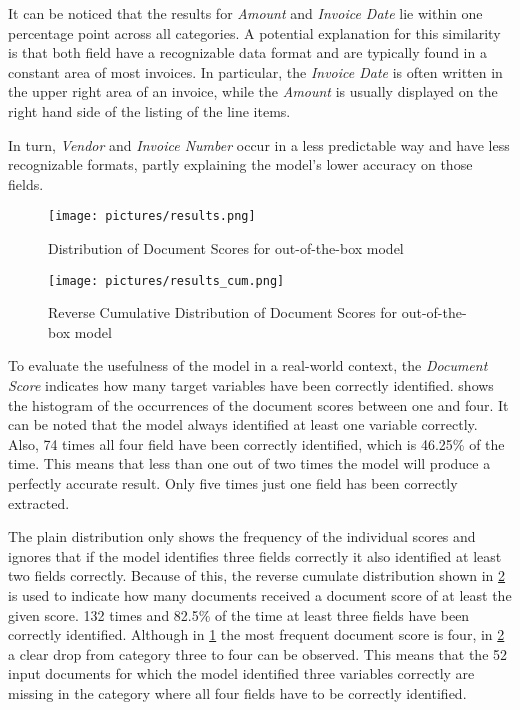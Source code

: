 It can be noticed that the results for \textit{Amount} and \textit{Invoice Date} lie within one percentage point across all categories. A potential explanation for this similarity is that both field have a recognizable data format and are typically found in a constant area of most invoices. In particular, the \textit{Invoice Date} is often written in the upper right area of an invoice, while the \textit{Amount} is usually displayed on the right hand side of the listing of the line items.

In turn, \textit{Vendor} and \textit{Invoice Number} occur in a less predictable way and have less recognizable formats, partly explaining the model's lower accuracy on those fields. 

\begin{figure}[!ht]
    \centering 
    \texttt{[image: pictures/results.png]}
    \caption{Distribution of Document Scores for out-of-the-box model}
    \label{pic:results_1}    %
\end{figure}
\begin{figure}[!ht]
    \centering 
    \texttt{[image: pictures/results\_cum.png]}
    \caption{Reverse Cumulative Distribution of Document Scores for out-of-the-box model}
    \label{pic:results_1_cum}    %
\end{figure}

To evaluate the usefulness of the model in a real-world context, the \textit{Document Score} indicates how many target variables have been correctly identified.  shows the histogram of the occurrences of the document scores between one and four. It can be noted that the model always identified at least one variable correctly. Also, 74 times all four field have been correctly identified, which is 46.25\% of the time. This means that less than one out of two times the model will produce a perfectly accurate result. Only five times just one field has been correctly extracted.

The plain distribution only shows the frequency of the individual scores and ignores that if the model identifies three fields correctly it also identified at least two fields correctly. Because of this, the reverse cumulate distribution shown in \cref{pic:results_1_cum} is used to indicate how many documents received a document score of at least the given score. 132 times and 82.5\% of the time at least three fields have been correctly identified. Although in \cref{pic:results_1} the most frequent document score is four, in \cref{pic:results_1_cum} a clear drop from category three to four can be observed. This means that the 52 input documents for which the model identified three variables correctly are missing in the category where all four fields have to be correctly identified.

